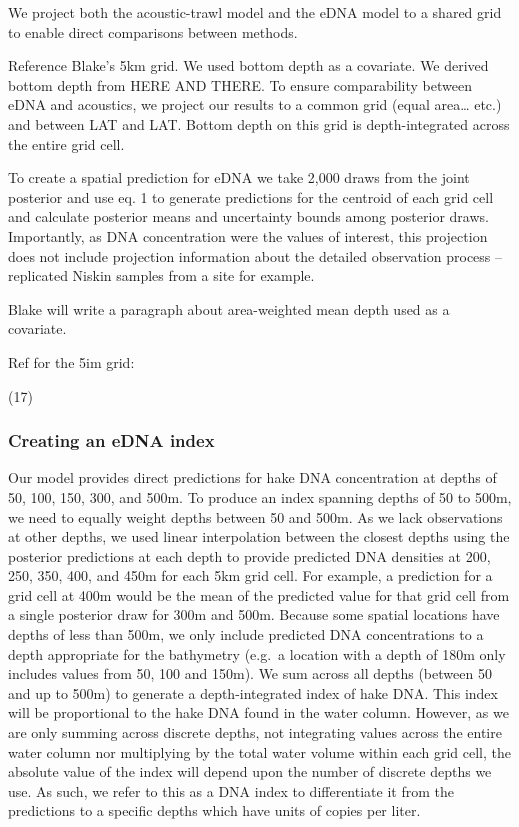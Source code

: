 \documentclass[
]{article}
\begin{document}
We project both the acoustic-trawl model and the eDNA model to a shared
grid to enable direct comparisons between methods.

Reference Blake's 5km grid. We used bottom depth as a covariate. We
derived bottom depth from HERE AND THERE. To ensure comparability
between eDNA and acoustics, we project our results to a common grid
(equal area\ldots{} etc.) and between LAT and LAT. Bottom depth on this
grid is depth-integrated across the entire grid cell.

To create a spatial prediction for eDNA we take 2,000 draws from the
joint posterior and use eq. 1 to generate predictions for the centroid
of each grid cell and calculate posterior means and uncertainty bounds
among posterior draws. Importantly, as DNA concentration were the values
of interest, this projection does not include projection information
about the detailed observation process -- replicated Niskin samples from
a site for example.

Blake will write a paragraph about area-weighted mean depth used as a
covariate.

Ref for the 5im grid:

(17)

\hypertarget{creating-an-edna-index}{%
\subsubsection{Creating an eDNA index}\label{creating-an-edna-index}}

Our model provides direct predictions for hake DNA concentration at
depths of 50, 100, 150, 300, and 500m. To produce an index spanning
depths of 50 to 500m, we need to equally weight depths between 50 and
500m. As we lack observations at other depths, we used linear
interpolation between the closest depths using the posterior predictions
at each depth to provide predicted DNA densities at 200, 250, 350, 400,
and 450m for each 5km grid cell. For example, a prediction for a grid
cell at 400m would be the mean of the predicted value for that grid cell
from a single posterior draw for 300m and 500m. Because some spatial
locations have depths of less than 500m, we only include predicted DNA
concentrations to a depth appropriate for the bathymetry (e.g.~a
location with a depth of 180m only includes values from 50, 100 and
150m). We sum across all depths (between 50 and up to 500m) to generate
a depth-integrated index of hake DNA. This index will be proportional to
the hake DNA found in the water column. However, as we are only summing
across discrete depths, not integrating values across the entire water
column nor multiplying by the total water volume within each grid cell,
the absolute value of the index will depend upon the number of discrete
depths we use. As such, we refer to this as a DNA index to differentiate
it from the predictions to a specific depths which have units of copies
per liter.
\end{document}
